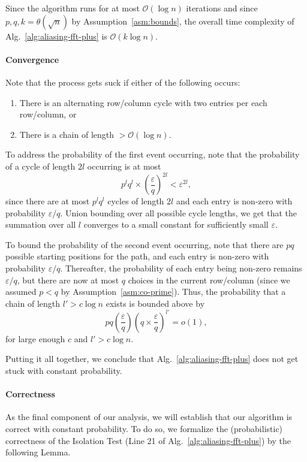 \documentclass[11pt]{article}
\newcommand{\eps}{\varepsilon}
\theoremstyle{case}
\newcommand{\Bigo}{\mathcal{O}}
\begin{document}
Since the algorithm runs for at most $\Bigo(\log n)$ iterations and since $p,q,k = \theta(\sqrt{n})$ by Assumption~\ref{asm:bounds}, the overall time complexity of Alg.~\ref{alg:aliasing-fft-plus} is $\Bigo(k \log n)$.

\paragraph{Convergence} Note that the process gets suck if either of the following occurs:
\begin{enumerate}
	\item There is an alternating row/column cycle with two entries per each row/column, or
    \item There is a chain of length $> \Bigo(\log n)$.
\end{enumerate}
To address the probability of the first event occurring, note that the probability of a cycle of length $2 l$ occurring is at most
$$
p^l q^l \times \left(\frac{\eps}{q}\right)^{2l} < \eps^{2l},
$$
since there are at most $p^l q^l$ cycles of length $2l$ and each entry is non-zero with probability $\eps/q$. Union bounding over all possible cycle lengths, we get that the summation over all $l$ converges to a small constant for sufficiently small $\eps$.

To bound the probability of the second event occurring, note that   there are $pq$ possible starting positions for the path, and each entry is non-zero with probability $\eps/q$. Thereafter, the probability of each entry being non-zero remains $\eps / q$, but there are now at most $q$ choices in the current row/column (since we assumed $p < q$ by Assumption~\ref{asm:co-prime}). Thus, 
the probability that a chain of length $l' > c \log n$ exists is bounded above by
$$
p q \left(\frac{\eps}{q}\right) \left(q \times \frac{\eps}{q}\right)^{l'} = o(1),
$$
for large enough $c$ and $l' > c \log n$.

Putting it all together, we conclude that Alg.~\ref{alg:aliasing-fft-plus} does not get stuck with constant probability.

\paragraph{Correctness}
As the final component of our analysis, we will establish that our algorithm is correct with constant probability. To do so, we formalize the (probabilistic) correctness of the Isolation Test (Line 21 of Alg.~\ref{alg:aliasing-fft-plus}) by the following Lemma.
\end{document}
